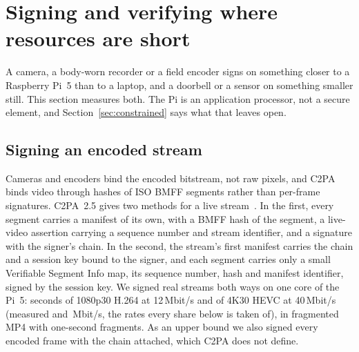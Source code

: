 \section{Signing and verifying where resources are short}
\label{sec:edge}

A camera, a body-worn recorder or a field encoder signs on something closer to
a Raspberry Pi~5 than to a laptop, and a doorbell or a sensor on something
smaller still. This section measures both. The Pi is an application processor,
not a secure element, and Section~\ref{sec:constrained} says what that leaves
open.

\subsection{Signing an encoded stream}
\label{sec:edge-video}

Cameras and encoders bind the encoded bitstream, not raw pixels, and C2PA
binds video through hashes of ISO BMFF segments rather than per-frame
signatures. C2PA~2.5 gives two methods for a live stream~\cite{c2pa25}. In the
first, every segment carries a manifest of its own, with a BMFF hash of the
segment, a live-video assertion carrying a sequence number and stream
identifier, and a signature with the signer's chain. In the second, the
stream's first manifest carries the chain and a session key bound to the
signer, and each segment carries only a small Verifiable Segment Info map,
its sequence number, hash and manifest identifier, signed by the session key.
We signed real streams both ways on one core of the Pi~5: \NstreamSeconds{} seconds of 1080p30 H.264 at 12\,Mbit/s and of 4K30 HEVC at 40\,Mbit/s (measured \NstreamMeasOneMbps{} and \NstreamMeasFourkMbps\,Mbit/s, the rates every share below is taken of), in fragmented MP4 with one-second fragments. As an upper bound we also signed every encoded frame with the
chain attached, which C2PA does not define.



